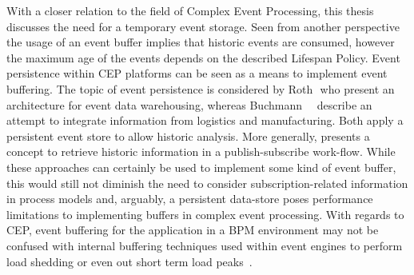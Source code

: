 

With a closer relation to the field of Complex Event Processing, this thesis discusses the need for a temporary event storage. 
Seen from another perspective the usage of an event buffer implies that historic events are consumed, however the maximum age of the events depends on the described Lifespan Policy.
Event persistence within CEP platforms can be seen as a means to implement event buffering.
The topic of event persistence is considered by Roth\,\etal\,\cite{roth2010event} who present an architecture for event data warehousing, whereas Buchmann~\etal~\cite{buchmann2010event} describe an attempt to integrate information from logistics and manufacturing. 
Both apply a persistent event store to allow historic analysis.
More generally, \cite{li2007historic} presents a concept to retrieve historic information in a publish-subscribe work-flow.
While these approaches can certainly be used to implement some kind of event buffer, this would still not diminish the need to consider subscription-related information in process models and, arguably, a persistent data-store poses performance limitations to implementing buffers in complex event processing.
With regards to CEP, event buffering for the application in a BPM environment may not be confused with internal buffering techniques used within event engines to perform load shedding or even out short term load peaks~\cite{chakravarthy2009stream}.

